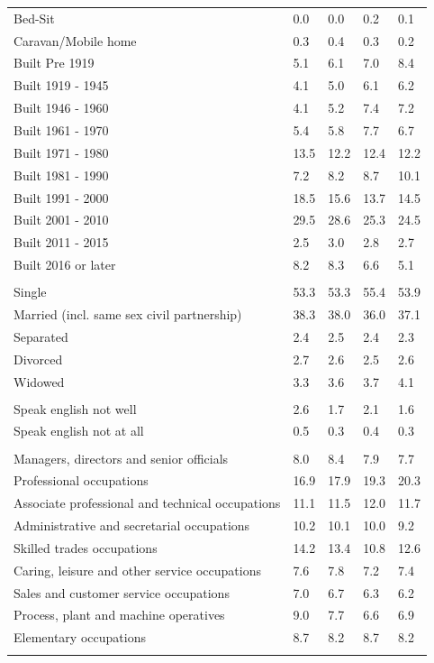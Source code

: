 \documentclass{article}
\begin{document}
\begin{table}[h]
\begin{tabular}{KTTTT}
Bed-Sit & 0.0& 0.0& 0.2& 0.1\\
Caravan/Mobile home & 0.3& 0.4& 0.3& 0.2\\
    \hline
Built Pre 1919 & 5.1& 6.1& 7.0& 8.4\\
Built 1919 - 1945 & 4.1& 5.0& 6.1& 6.2\\
Built  1946 - 1960 & 4.1& 5.2& 7.4& 7.2\\
Built  1961 - 1970 & 5.4& 5.8& 7.7& 6.7\\
Built  1971 - 1980 & 13.5& 12.2& 12.4& 12.2\\
Built  1981 - 1990 &  7.2&  8.2&  8.7& 10.1\\
Built  1991 - 2000 & 18.5& 15.6& 13.7& 14.5\\
Built  2001 - 2010 & 29.5& 28.6& 25.3& 24.5\\
Built  2011 - 2015 & 2.5& 3.0& 2.8& 2.7\\
Built  2016 or later & 8.2& 8.3& 6.6& 5.1\\
\hline
    \\
    \hline
Single & 53.3& 53.3& 55.4& 53.9\\
Married (incl. same sex civil partnership) & 38.3& 38.0& 36.0& 37.1\\
Separated  & 2.4& 2.5& 2.4& 2.3\\
Divorced  & 2.7& 2.6& 2.5& 2.6\\
Widowed & 3.3& 3.6& 3.7& 4.1\\
\hline
    \\ 
    \hline
Speak english not well & 2.6& 1.7& 2.1& 1.6\\
Speak english not at all & 0.5& 0.3& 0.4& 0.3\\
\hline
    \\
    \hline
Managers, directors and senior officials & 8.0& 8.4& 7.9& 7.7\\
Professional occupations & 16.9& 17.9& 19.3& 20.3\\
Associate professional and technical occupations & 11.1& 11.5& 12.0& 11.7\\
Administrative and secretarial occupations & 10.2& 10.1& 10.0&  9.2\\
Skilled trades occupations & 14.2& 13.4& 10.8& 12.6\\
Caring, leisure and other service occupations & 7.6& 7.8& 7.2& 7.4\\
Sales and customer service occupations & 7.0& 6.7& 6.3& 6.2\\
Process, plant and machine operatives & 9.0& 7.7& 6.6& 6.9\\
Elementary occupations & 8.7& 8.2& 8.7& 8.2\\
\hline
\end{tabular}
\end{table}
\end{document}
